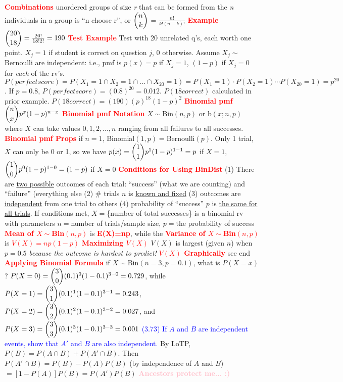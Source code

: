 \documentclass[10pt]{extarticle}
\let\oldtextbf\textbf
\renewcommand{\textbf}[1]{\textcolor{red}{\oldtextbf{#1}}}
\newcommand{\bluebf}[1]{\textcolor{blue}{#1}}
\newcommand{\pinkbf}[1]{\textcolor{pink}{\oldtextbf{#1}}}
\begin{document}
\textbf{Combinations} unordered groups of size \emph{r} that can be formed from the \emph{n} individuals in a group is ``n choose r'', or
\textbf{$\dbinom{n}{k}$} = $\frac{n!}{k!(n-k)!}$
\textbf{Example} $\dbinom{20}{18}=\frac{20!}{18!2!}=190$
\textbf{Test Example} Test with 20 unrelated q's, each worth one point. $X_{j}=1$ if student is correct on question $j$, $0$ otherwise. Assume $X_{j} \mathtt{\sim}$Bernoulli are independent: i.e., pmf is $p(x) =  p$ if $X_{j}=1$, $(1-p)$ if $X_{j}=0$ for \emph{each} of the rv's. $P(perfect score) = P(X_{1}=1\cap X_{2}=1\cap...\cap X_{20}=1)=P(X_{1}=1)\cdot P(X_{2}=1)\cdots P(X_{20}=1)=p^{20}$. If $p=0.8$, $P(perfect score)=(0.8)^{20} = 0.012$. $P(18 correct)$ calculated in prior example. $P(18 correct) = (190)(p)^{18}(1-p)^{2}$
\textbf{Binomial pmf} $\dbinom{n}{x}p^{x}(1-p)^{n-x}$
\textbf{Binomial pmf Notation} $X\mathtt{\sim}$Bin$(n,p)$ or b$(x;n,p)$ where $X$ can take values ${0,1,2,...,n}$ ranging from all failures to all successes.
\textbf{Binomial pmf Props} if $n=1$, Binomial$(1,p) = $Bernoulli$(p)$. Only 1 trial, $X$ can only be 0 or 1, so we have $p(x) = \dbinom{1}{1}p^{1}(1-p)^{1-1}=p$ if $X=1$, $\dbinom{1}{0}p^{0}(1-p)^{1-0}=(1-p)$ if $X=0$
\textbf{Conditions for Using BinDist} (1) There are \underline{two possible} outcomes of each trial: ``success'' (what we are counting) and ``failure'' (everything else (2) \# trials $n$ is \underline{known and fixed} (3) outcomes are \underline{independent} from one trial to others (4) probability of ``success'' $p$ is \underline{the same for all trials}. If conditions met, $X=$\{number of total successes\} is a binomial rv with parameters $n=$number of trials/sample size, $p=$the probability of success
\textbf{Mean of $X\mathtt{\sim}$Bin$(n,p)$} is
\textbf{E(X)=np}, while the
\textbf{Variance of $X\mathtt{\sim}$Bin$(n,p)$} is
\textbf{$V(X)=np(1-p)$}
\textbf{Maximizing $V(X)$} $V(X)$ is largest (given $n$) when $p=0.5$ \emph{because the outcome is hardest to predict!}
\textbf{$V(X)$ Graphically} see end
\textbf{Applying Binomial Formula} if $X\mathtt{\sim}$Bin$(n=3,p=0.1)$, what is $P(X=x)$? $P(X=0)=\dbinom{3}{0}(0.1)^0(1-0.1)^{3-0}=0.729$, while $P(X=1)=\dbinom{3}{1}(0.1)^{1}(1-0.1)^{3-1}=0.243$, $P(X=2)=\dbinom{3}{2}(0.1)^{2}(1-0.1)^{3-2}=0.027$, and $P(X=3)=\dbinom{3}{3}(0.1)^{3}(1-0.1)^{3-3}=0.001$
\bluebf{(3.73) If $A$ and $B$ are independent events, show that $A'$ and $B$ are also independent.} By LoTP, $P(B) = P(A\cap B) + P(A'\cap B)$. Then $P(A'\cap B) = P(B) - P(A)P(B)$ (by independence of $A$ and $B$) $= [1-P(A)]P(B) = P(A')P(B)$
\pinkbf{Ancestors protect me... :)}
 
\end{document}
